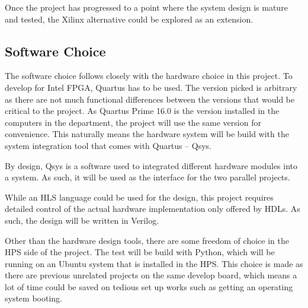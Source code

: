 Once the project has progressed to a point where the system design is mature and
tested, the Xilinx alternative could be explored as an extension.

\subsection{Software Choice}
The software choice follows closely with the hardware choice in this project.
To develop for Intel FPGA, Quartus has to be used.
The version picked is arbitrary as there are not much functional differences
between the versions that would be critical to the project.
As Quartus Prime 16.0 is the version installed in the computers in the
department, the project will use the same version for convenience.
This naturally means the hardware system will be build with the system
integration tool that comes with Quartus -- Qsys.

By design, Qsys is a software used to integrated different hardware modules
into a system.
As such, it will be used as the interface for the two parallel projects.

While an HLS language could be used for the design, this project requires
detailed control of the actual hardware implementation only offered by HDLs.
As such, the design will be written in Verilog.

Other than the hardware design tools, there are some freedom of choice in the
HPS side of the project.
The test will be build with Python, which will be running on an Ubuntu system
that is installed in the HPS.
This choice is made as there are previous unrelated projects on the same
develop board, which means a lot of time could be saved on tedious set up works
such as getting an operating system booting.